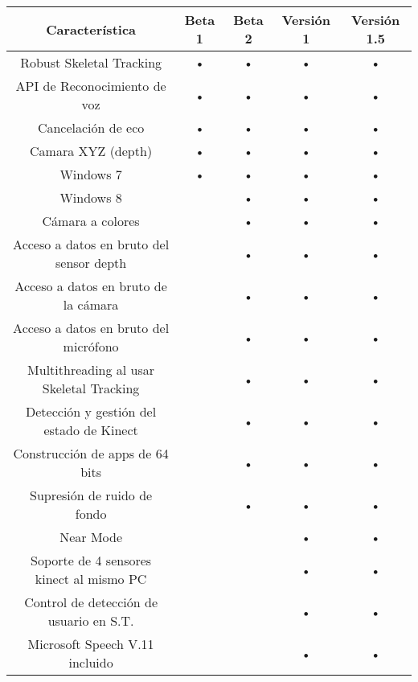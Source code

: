 \documentclass[11pt,a4paper]{article}
\begin{document}
\begin{table}
\begin{tabular}{||c||c||c||c||c||}
\hline Característica                           & Beta 1 & Beta 2 & Versión 1 & Versión 1.5 \\ 
\hline Robust Skeletal Tracking                 & •      & •      & •         & •           \\ 
\hline API de Reconocimiento de voz             & •      & •      & •         & •           \\ 
\hline Cancelación de eco                       & •      & •      & •         & •           \\ 
\hline Camara XYZ (depth)                       & •      & •      & •         & •           \\ 
\hline Windows 7                                & •      & •      & •         & •           \\ 
\hline Windows 8                                &        & •      & •         & •           \\ 
\hline Cámara a colores                         &        & •      & •         & •           \\ 
\hline Acceso a datos en bruto del sensor depth &        & •      & •         & •           \\ 
\hline Acceso a datos en bruto de la cámara     &        & •      & •         & •           \\ 
\hline Acceso a datos en bruto del micrófono    &        & •      & •         & •           \\ 
\hline Multithreading al usar Skeletal Tracking &        & •      & •         & •           \\ 
\hline Detección y gestión del estado de Kinect &        & •      & •         & •           \\ 
\hline Construcción de apps de 64 bits          &        & •      & •         & •           \\ 
\hline Supresión de ruido de fondo              &        & •      & •         & •           \\ 
\hline Near Mode                                &        &        & •         & •           \\
\hline Soporte de 4 sensores kinect al mismo PC &        &        & •         & •           \\ 
\hline Control de detección de usuario en S.T.  &        &        & •         & •           \\ 
\hline Microsoft Speech V.11 incluido           &        &        & •         & •           \\  

\end{tabular}
\end{table}
\end{document}
